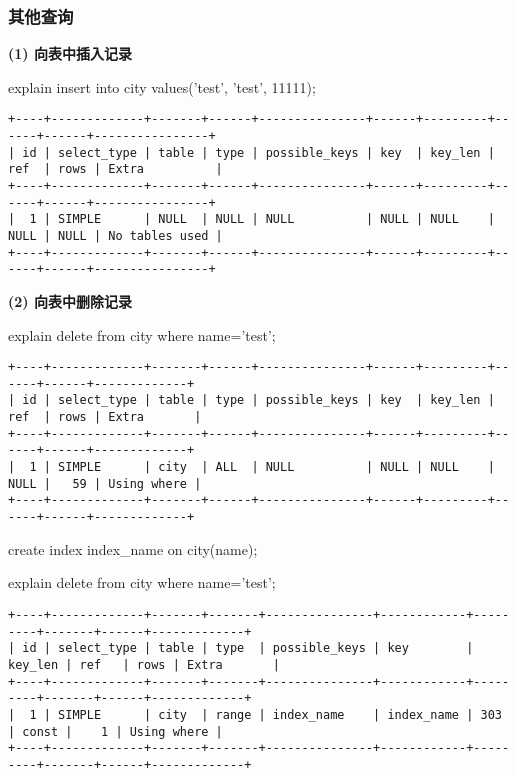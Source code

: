 \documentclass[a4paper, 11pt, nofonts, nocap, fancyhdr]{ctexart}
\begin{document}
\subsubsection{其他查询}

\textbf{(1) 向表中插入记录} 

explain insert into city values('test', 'test', 11111);

\begin{verbatim}
+----+-------------+-------+------+---------------+------+---------+------+------+----------------+
| id | select_type | table | type | possible_keys | key  | key_len | ref  | rows | Extra          |
+----+-------------+-------+------+---------------+------+---------+------+------+----------------+
|  1 | SIMPLE      | NULL  | NULL | NULL          | NULL | NULL    | NULL | NULL | No tables used |
+----+-------------+-------+------+---------------+------+---------+------+------+----------------+
\end{verbatim}

\vspace{0.7cm}

\textbf{(2) 向表中删除记录} 

explain delete from city where name='test';

\begin{verbatim}
+----+-------------+-------+------+---------------+------+---------+------+------+-------------+
| id | select_type | table | type | possible_keys | key  | key_len | ref  | rows | Extra       |
+----+-------------+-------+------+---------------+------+---------+------+------+-------------+
|  1 | SIMPLE      | city  | ALL  | NULL          | NULL | NULL    | NULL |   59 | Using where |
+----+-------------+-------+------+---------------+------+---------+------+------+-------------+
\end{verbatim}

create index index\_name on city(name);

explain delete from city where name='test';

\begin{verbatim}
+----+-------------+-------+-------+---------------+------------+---------+-------+------+-------------+
| id | select_type | table | type  | possible_keys | key        | key_len | ref   | rows | Extra       |
+----+-------------+-------+-------+---------------+------------+---------+-------+------+-------------+
|  1 | SIMPLE      | city  | range | index_name    | index_name | 303     | const |    1 | Using where |
+----+-------------+-------+-------+---------------+------------+---------+-------+------+-------------+
\end{verbatim}
\end{document}
